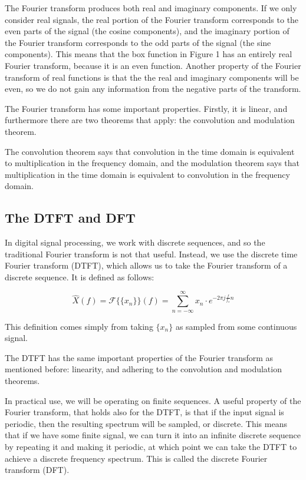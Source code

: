 \documentclass[12pt]{article}
\begin{document}
\begin{minipage}{\textwidth}
  \centering
\end{minipage}

The Fourier transform produces both real and imaginary components. If we only consider real signals, the real portion of the Fourier transform corresponds to the even parts of the signal (the cosine components), and the imaginary portion of the Fourier transform corresponds to the odd parts of the signal (the sine components). This means that the box function in Figure 1 has an entirely real Fourier transform, because it is an even function. Another property of the Fourier transform of real functions is that the the real and imaginary components will be even, so we do not gain any information from the negative parts of the transform.

The Fourier transform has some important properties. Firstly, it is linear, and furthermore there are two theorems that apply: the convolution and modulation theorem.

The convolution theorem says that convolution in the time domain is equivalent to multiplication in the frequency domain, and the modulation theorem says that multiplication in the time domain is equivalent to convolution in the frequency domain.

\subsection{The DTFT and DFT}

In digital signal processing, we work with discrete sequences, and so the traditional Fourier transform is not that useful. Instead, we use the discrete time Fourier transform (DTFT), which allows us to take the Fourier transform of a discrete sequence. It is defined as follows:

\[
  \hat{X}(f) = \mathcal{F}\{\{x_n\}\}(f) = \sum_{n=-\infty}^\infty x_n \cdot e^{-2\pi j \frac{f}{f_s}n}
\] 

This definition comes simply from taking $\{x_n\}$ as sampled from some continuous signal.

The DTFT has the same important properties of the Fourier transform as mentioned before: linearity, and adhering to the convolution and modulation theorems.

In practical use, we will be operating on finite sequences. A useful property of the Fourier transform, that holds also for the DTFT, is that if the input signal is periodic, then the resulting spectrum will be sampled, or discrete. This means that if we have some finite signal, we can turn it into an infinite discrete sequence by repeating it and making it periodic, at which point we can take the DTFT to achieve a discrete frequency spectrum. This is called the discrete Fourier transform (DFT).
\end{document}
